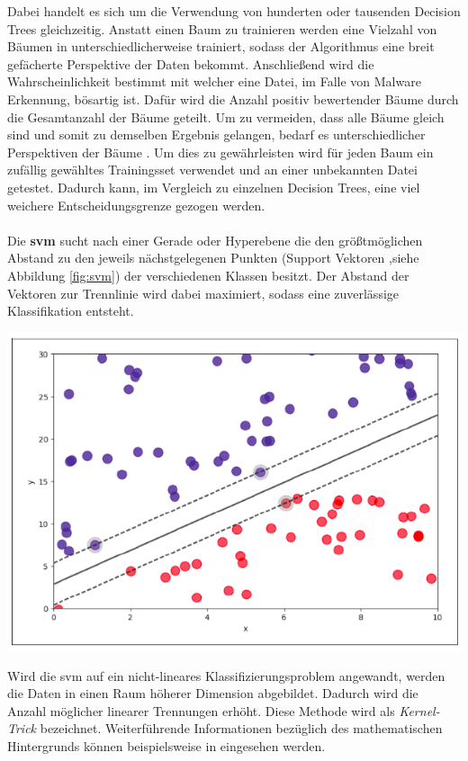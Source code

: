 \documentclass[
    12pt, %
    DIV10,
    ngerman, %
    a4paper, %
    oneside, %
    titlepage, %
    parskip=half, %
    headings=normal, %
    listof=totoc, %
    bibliography=totoc, %
    index=totoc, %
    captions=tableheading, %
    final %
]{scrreprt}
\begin{document}
Dabei handelt es sich um die Verwendung von hunderten oder tausenden Decision Trees gleichzeitig. Anstatt einen Baum zu trainieren werden eine Vielzahl von Bäumen in unterschiedlicherweise trainiert, sodass der Algorithmus eine breit gefächerte Perspektive der Daten bekommt. Anschlie{\ss}end wird die Wahrscheinlichkeit bestimmt mit welcher eine Datei, im Falle von Malware Erkennung, bösartig ist. Dafür wird die Anzahl positiv bewertender Bäume durch die Gesamtanzahl der Bäume geteilt. Um zu vermeiden, dass alle Bäume gleich sind und somit zu demselben Ergebnis gelangen, bedarf es unterschiedlicher Perspektiven der Bäume \parencite{JoshuaSaxe2018}. Um dies zu gewährleisten wird für jeden Baum ein zufällig gewähltes Trainingsset verwendet und an einer unbekannten Datei getestet. Dadurch kann, im Vergleich zu einzelnen Decision Trees, eine viel weichere Entscheidungsgrenze gezogen werden.
\\\\
Die \textbf{\acl{svm}} sucht nach einer Gerade oder Hyperebene die den grö{\ss}tmöglichen Abstand zu den jeweils nächstgelegenen Punkten (Support Vektoren ,siehe Abbildung \ref{fig:svm}) der verschiedenen Klassen besitzt. Der Abstand der Vektoren zur Trennlinie wird dabei maximiert, sodass eine zuverlässige Klassifikation entsteht.
\begin{center}
\includegraphics[scale=0.4]{img/svm.png}
\label{fig:svm}
\end{center}
Wird die \ac{svm} auf ein nicht-lineares Klassifizierungsproblem angewandt, werden die Daten in einen Raum höherer Dimension abgebildet. Dadurch wird die Anzahl möglicher linearer Trennungen erhöht. Diese Methode wird als \emph{Kernel-Trick} bezeichnet. Weiterführende Informationen bezüglich des mathematischen Hintergrunds können beispielsweise in \textcite{nguyen2018machine} eingesehen werden.
\end{document}
